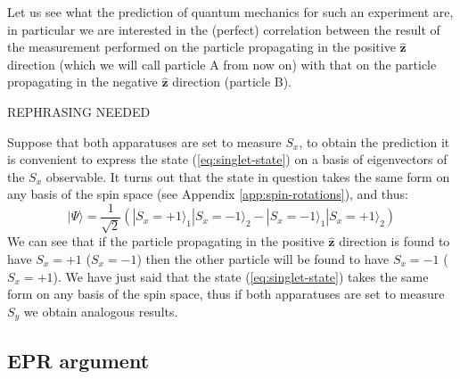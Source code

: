 Let us see what the prediction of quantum mechanics for such an experiment are, in particular we are interested in the (perfect) correlation between the result of the measurement performed on the particle propagating in the positive $\hat{\textbf{z}}$ direction (which we will call particle A from now on) with that on the particle propagating in the negative $\hat{\textbf{z}}$ direction (particle B).

REPHRASING NEEDED

Suppose that both apparatuses are set to measure $S_x$, to obtain the prediction it is convenient to express the state (\ref{eq:singlet-state}) on a basis of eigenvectors of the $S_x$ observable. It turns out that the state in question takes the same form on any basis of the spin space (see Appendix \ref{app:spin-rotations}), and thus:
\begin{equation*}
  |\Psi\rangle = \frac{1}{\sqrt{2}} \left( |S_x = + 1\rangle_1 |S_x = - 1\rangle_2 - |S_x = - 1\rangle_1 |S_x = + 1\rangle_2 \right)
\end{equation*}
We can see that if the particle propagating in the positive $\hat{\textbf{z}}$ direction is found to have $S_x = + 1$ ($S_x = - 1$) then the other particle will be found to have $S_x = - 1$ ($S_x = + 1$).
We have just said that the state (\ref{eq:singlet-state}) takes the same form on any basis of the spin space, thus if both apparatuses are set to measure $S_y$ we obtain analogous results.

\subsection*{EPR argument}


